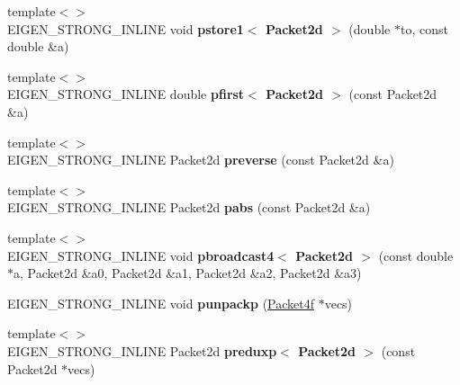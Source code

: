 \begin{DoxyCompactItemize}
\item 
\mbox{\label{namespace_eigen_1_1internal_a4e9d4d78a5b2fc0d065d7b7543f54f96}} 
{\footnotesize template$<$$>$ }\\E\+I\+G\+E\+N\+\_\+\+S\+T\+R\+O\+N\+G\+\_\+\+I\+N\+L\+I\+NE void {\bfseries pstore1$<$ Packet2d $>$} (double $\ast$to, const double \&a)
\item 
\mbox{\label{namespace_eigen_1_1internal_af4d7bfd00624245c9481aa794165acb8}} 
{\footnotesize template$<$$>$ }\\E\+I\+G\+E\+N\+\_\+\+S\+T\+R\+O\+N\+G\+\_\+\+I\+N\+L\+I\+NE double {\bfseries pfirst$<$ Packet2d $>$} (const Packet2d \&a)
\item 
\mbox{\label{namespace_eigen_1_1internal_afec2557d181b7c67d670cf51c628c103}} 
{\footnotesize template$<$$>$ }\\E\+I\+G\+E\+N\+\_\+\+S\+T\+R\+O\+N\+G\+\_\+\+I\+N\+L\+I\+NE Packet2d {\bfseries preverse} (const Packet2d \&a)
\item 
\mbox{\label{namespace_eigen_1_1internal_ad5ef11ae779af69a15ceef5761329d15}} 
{\footnotesize template$<$$>$ }\\E\+I\+G\+E\+N\+\_\+\+S\+T\+R\+O\+N\+G\+\_\+\+I\+N\+L\+I\+NE Packet2d {\bfseries pabs} (const Packet2d \&a)
\item 
\mbox{\label{namespace_eigen_1_1internal_aa7c05c9c964fec8b1867c3ec9cb64806}} 
{\footnotesize template$<$$>$ }\\E\+I\+G\+E\+N\+\_\+\+S\+T\+R\+O\+N\+G\+\_\+\+I\+N\+L\+I\+NE void {\bfseries pbroadcast4$<$ Packet2d $>$} (const double $\ast$a, Packet2d \&a0, Packet2d \&a1, Packet2d \&a2, Packet2d \&a3)
\item 
\mbox{\label{namespace_eigen_1_1internal_a62c23ae3be5330c3ba229b9becb68395}} 
E\+I\+G\+E\+N\+\_\+\+S\+T\+R\+O\+N\+G\+\_\+\+I\+N\+L\+I\+NE void {\bfseries punpackp} (\hyperlink{struct_eigen_1_1internal_1_1_packet4f}{Packet4f} $\ast$vecs)
\item 
\mbox{\label{namespace_eigen_1_1internal_ac11481314738487cf1c84dba8c21ff8b}} 
{\footnotesize template$<$$>$ }\\E\+I\+G\+E\+N\+\_\+\+S\+T\+R\+O\+N\+G\+\_\+\+I\+N\+L\+I\+NE Packet2d {\bfseries preduxp$<$ Packet2d $>$} (const Packet2d $\ast$vecs)

\end{DoxyCompactItemize}
